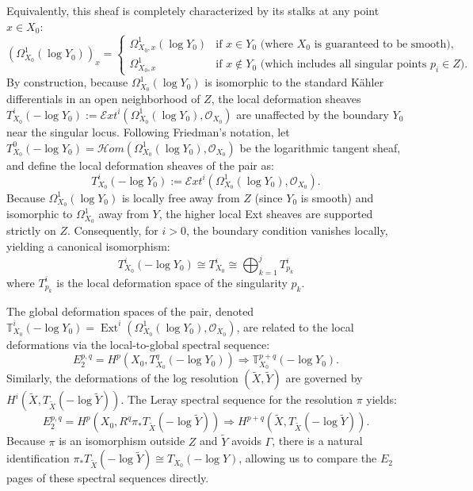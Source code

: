 \documentclass[11pt]{article}
\theoremstyle{definition}
\newcommand{\OO}{\mathcal{O}}
\begin{document}
Equivalently, this sheaf is completely characterized by its stalks at any point $x \in X_0$:
$$
\left( \Omega_{X_0}^1(\log Y_0) \right)_x = 
\begin{cases} 
\Omega_{X_0, x}^1(\log Y_0) & \text{if } x \in Y_0 \text{ (where } X_0 \text{ is guaranteed to be smooth)}, \\
\Omega_{X_0, x}^1 & \text{if } x \notin Y_0 \text{ (which includes all singular points } p_i \in Z).
\end{cases}
$$
By construction, because $\Omega_{X_0}^1(\log Y_0)$ is isomorphic to the standard K\"ahler differentials in an open neighborhood of $Z$, the local deformation sheaves $T_{X_0}^i(-\log Y_0) := \mathcal{E}xt^i(\Omega_{X_0}^1(\log Y_0), \OO_{X_0})$ are unaffected by the boundary $Y_0$ near the singular locus.
Following Friedman's notation, let $T_{X_0}^0(-\log Y_0) = \mathcal{H}om(\Omega_{X_0}^1(\log Y_0), \OO_{X_0})$ be the logarithmic tangent sheaf, and define the local deformation sheaves of the pair as:
\[
T_{X_0}^i(-\log Y_0) := \mathcal{E}xt^i(\Omega_{X_0}^1(\log Y_0), \OO_{X_0}).
\]
Because $\Omega_{X_0}^1(\log Y_0)$ is locally free away from $Z$ (since $Y_0$ is smooth) and isomorphic to $\Omega_{X_0}^1$ away from $Y$, the higher local Ext sheaves are supported strictly on $Z$. Consequently, for $i > 0$, the boundary condition vanishes locally, yielding a canonical isomorphism:
\[
T_{X_0}^i(-\log Y_0) \cong T_{X_0}^i \cong \bigoplus_{k=1}^j T_{p_k}^i
\]
where $T_{p_k}^i$ is the local deformation space of the singularity $p_k$.

The global deformation spaces of the pair, denoted $\mathbb{T}_{X_0}^i(-\log Y_0) = \operatorname{Ext}^i(\Omega_{X_0}^1(\log Y_0), \OO_{X_0})$, are related to the local deformations via the local-to-global spectral sequence:
\[
E_2^{p,q} = H^p(X_0, T_{X_0}^q(-\log Y_0)) \Rightarrow \mathbb{T}_{X_0}^{p+q}(-\log Y_0).
\]
Similarly, the deformations of the log resolution $(\tilde{X}, \tilde{Y})$ are governed by $H^i(\tilde{X}, T_{\tilde{X}}(-\log \tilde{Y}))$. The Leray spectral sequence for the resolution $\pi$ yields:
\[
E_2^{p,q} = H^p(X_0, R^q \pi_* T_{\tilde{X}}(-\log \tilde{Y})) \Rightarrow H^{p+q}(\tilde{X}, T_{\tilde{X}}(-\log \tilde{Y})).
\]
Because $\pi$ is an isomorphism outside $Z$ and $\tilde{Y}$ avoids $\Gamma$, there is a natural identification $\pi_* T_{\tilde{X}}(-\log \tilde{Y}) \cong T_{X_0}(-\log Y)$, allowing us to compare the $E_2$ pages of these spectral sequences directly.
\end{document}
